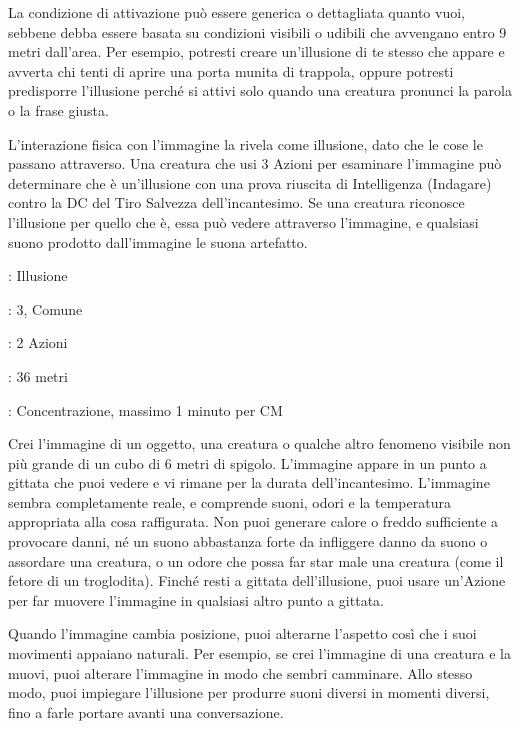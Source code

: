 \begin{multicols}{2}
La condizione di attivazione può essere generica o dettagliata quanto vuoi, sebbene debba essere basata su condizioni visibili o udibili che avvengano entro 9 metri dall'area. Per esempio, potresti creare un'illusione di te stesso che appare e avverta chi tenti di aprire una porta munita di trappola, oppure potresti predisporre l'illusione perché si attivi solo quando una creatura pronunci la parola o la frase giusta.

L'interazione fisica con l'immagine la rivela come illusione, dato che le cose le passano attraverso. Una creatura che usi 3 Azioni per esaminare l'immagine può determinare che è un'illusione con una prova riuscita di Intelligenza (Indagare) contro la DC del Tiro Salvezza dell'incantesimo. Se una creatura riconosce l'illusione per quello che è, essa può vedere attraverso l'immagine, e qualsiasi suono prodotto dall'immagine le suona artefatto.

\noindent\colorbox{OBSSgold!10}{
\begin{minipage}{0.95\linewidth}
\begin{description}[noitemsep, topsep=0pt, parsep=0pt, partopsep=0pt, leftmargin=0cm, labelwidth=1.3cm]
	\item[\textbf{Lista}]: Illusione
	\item[\textbf{Livello}]: 3, Comune
	\item[\textbf{Lancio}]: 2 Azioni
	\item[\textbf{Gittata}]: 36 metri
	\item[\textbf{Durata}]: Concentrazione, massimo 1 minuto per CM
\end{description}
\end{minipage}}\smallskip

Crei l'immagine di un oggetto, una creatura o qualche altro fenomeno visibile non più grande di un cubo di 6 metri di spigolo. L'immagine appare in un punto a gittata che puoi vedere e vi rimane per la durata dell'incantesimo. L'immagine sembra completamente reale, e comprende suoni, odori e la temperatura appropriata alla cosa raffigurata. Non puoi generare calore o freddo sufficiente a provocare danni, né un suono abbastanza forte da infliggere danno da suono o assordare una creatura, o un odore che possa far star male una creatura (come il fetore di un troglodita). Finché resti a gittata dell'illusione, puoi usare un'Azione per far muovere l'immagine in qualsiasi altro punto a gittata.

Quando l'immagine cambia posizione, puoi alterarne l'aspetto così che i suoi movimenti appaiano naturali. Per esempio, se crei l'immagine di una creatura e la muovi, puoi alterare l'immagine in modo che sembri camminare. Allo stesso modo, puoi impiegare l'illusione per produrre suoni diversi in momenti diversi, fino a farle portare avanti una conversazione.


\end{multicols}
